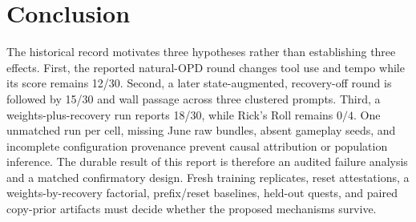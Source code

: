 \documentclass[11pt]{article}
\begin{document}
\section{Conclusion}
The historical record motivates three hypotheses rather than establishing three effects. First,
the reported natural-OPD round changes tool use and tempo while its score remains 12/30. Second,
a later state-augmented, recovery-off round is followed by 15/30 and wall passage across three
clustered prompts. Third, a weights-plus-recovery run reports 18/30, while Rick's Roll remains
$0/4$. One unmatched run per cell, missing June raw bundles, absent gameplay seeds, and incomplete
configuration provenance prevent causal attribution or population inference. The durable result
of this report is therefore an audited failure analysis and a matched confirmatory design. Fresh
training replicates, reset attestations, a weights-by-recovery factorial, prefix/reset baselines,
held-out quests, and paired copy-prior artifacts must decide whether the proposed mechanisms
survive.
\end{document}
